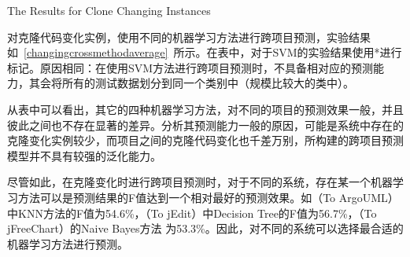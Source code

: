 
{The Results for Clone Changing Instances}

对克隆代码变化实例，使用不同的机器学习方法进行跨项目预测，实验结果如~\ref{changingcrossmethodaverage}~所示。在表中，对于SVM的实验结果使用{*}进行标记。原因相同：在使用SVM方法进行跨项目预测时，不具备相对应的预测能力，其会将所有的测试数据划分到同一个类别中（规模比较大的类中）。

从表中可以看出，其它的四种机器学习方法，对不同的项目的预测效果一般，并且彼此之间也不存在显著的差异。分析其预测能力一般的原因，可能是系统中存在的克隆变化实例较少，而项目之间的克隆代码变化也千差万别，所构建的跨项目预测模型并不具有较强的泛化能力。

尽管如此，在克隆变化时进行跨项目预测时，对于不同的系统，存在某一个机器学习方法可以是预测结果的F值达到一个相对最好的预测效果。如（To ArgoUML）中KNN方法的F值为54.6\%，（To jEdit）中Decision Tree的F值为56.7\%，（To jFreeChart）的Naive Bayes方法 为53.3\%。因此，对不同的系统可以选择最合适的机器学习方法进行预测。 

